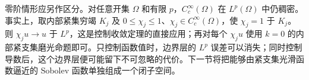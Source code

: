 \ProseParagraphBreak

零阶情形应另作区分。对任意开集 \(\Omega\) 和有限 \(p\)，\(C_c^\infty(\Omega)\) 在 \(L^p(\Omega)\) 中仍稠密。事实上，取内部紧集穷竭 \(K_j\) 及 \(0\leq\chi_j\leq1\)、\(\chi_j\in C_c^\infty(\Omega)\)，使 \(\chi_j=1\) 于 \(K_j\)。则 \(\chi_j u\to u\) 于 \(L^p\)，这是控制收敛定理的直接应用；再对每个 \(\chi_j u\) 使用 \(k=0\) 的内部紧支集磨光命题即可。只控制函数值时，边界层的 \(L^p\) 误差可以消失；同时控制导数后，这个边界层便可能留下不可忽略的代价。下一节将把能够由紧支集光滑函数逼近的 Sobolev 函数单独组成一个闭子空间。
